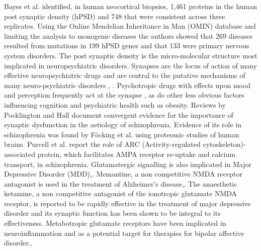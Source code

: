 Bayes et al.\cite{bayes2011characterization} identified, in human neocortical biopsies, 1,461 proteins in the human post synaptic density (hPSD) and 748 that were consistent across three replicates. Using the Online Mendelian Inheritance in Man (OMIN) database \cite{hamosh2005online} and limiting the analysis to monogenic diseases the authors showed that 269 diseases resulted from mutations in 199 hPSD genes and that 133 were primary nervous system disorders. The post synaptic density is the micro-molecular structure most implicated in neuropsychiatric disorders\cite{grant2012synaptopathies}. Synapses are the locus of action of many effective neuropsychiatric drugs and are central to the putative mechanisms of many neuro-psychiatric disorders \cite{thompson2015excitatory}, \cite{hu2015glutamate}. Psychotropic drugs with effects upon mood and perception frequently act at the synapse \cite{korpi2015mechanisms}, as do other less obvious factors influencing cognition and psychiatric health such as obesity\cite{bocarsly2015obesity}. Reviews by Pocklington \cite{pocklington2014synapse} and Hall \cite{hall2015genetic} document convergent evidence for the importance of synaptic dysfunction in the aetiology of schizophrenia. 
 Evidence of its role in schizophrenia was found by F{\"o}cking et al.\cite{focking2015proteomic} using proteomic studies of human brains. Purcell et al.\cite{purcell2014polygenic} report the role of ARC (Activity-regulated cytoskeleton)-associated protein, which facilitates AMPA receptor re-uptake and calcium transport, in schizophrenia. 
Glutamatergic signalling is also implicated in Major Depressive Disorder (MDD)\cite{murrough2017targeting},\cite{de2017genetic}. Memantine, a non competitive NMDA receptor antagonist is used in the treatment of Alzheimer's disease\cite{mcshane2019memantine},\cite{amin2021bedside}. The anaesthetic ketamine, a non competitive antagonist of the ionotropic glutamate NMDA receptor, is reported to be rapidly effective in the treatment of major depressive disorder and its synaptic function has been shown to be integral to its effectiveness\cite{kavalali2015does}. Metabotropic glutamate receptors have been implicated in neuroinflammation and as a potential target for therapies for bipolar affective disorder\cite{fazio2018targeting},\cite{king2019inflammation}.

